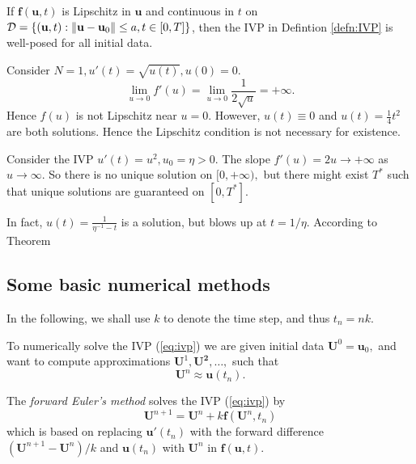 \begin{defn}
  If $\mathbf{f}(\mathbf{u},t)$ is Lipschitz in $\mathbf{u}$ and
  continuous in $t$ on ${\cal
    D}=\{(\mathbf{u},t):\Vert\mathbf{u}-\mathbf{u}_0\Vert\leq a,t\in
  [0,T]\}$, then the IVP in Defintion \ref{defn:IVP} is well-posed
  for all initial data.
\end{defn}

\begin{exm}
  Consider $N=1,u'(t)=\sqrt{u(t)},u(0)=0.$
  \begin{displaymath}
    \lim_{u\rightarrow 0} f'(u)=\lim_{u\rightarrow 0}
    \frac{1}{2\sqrt{u}}=+\infty.
  \end{displaymath}
  Hence $f(u)$ is not Lipschitz near $u=0$.
  However, $u(t)\equiv 0$ and $u(t)=\frac{1}{4}t^2$ are both
  solutions.
  Hence the Lipschitz condition is not necessary for existence.
\end{exm}

\begin{exm}
  Consider the IVP $u'(t)=u^2,u_0=\eta>0.$
  The slope $f'(u)=2u \rightarrow +\infty$ as $u\rightarrow \infty$.
  So there is no unique solution on $[0,+\infty),$ but there might
  exist
  $T^*$ such that unique solutions are guaranteed on $[0,T^*]$.

  In fact, $u(t)=\frac{1}{\eta^{-1}-t}$ is a solution,
  but blows up at $t=1/\eta.$
  According to Theorem 
\end{exm}


\subsection{Some basic numerical methods}

\label{sec:some-basic-numerical}
\begin{ntn}
  In the following, we shall use $k$ to denote the time step,
  and thus $t_n=nk$.
\end{ntn}

To numerically solve the IVP (\ref{eq:ivp}) we are given
initial data $\mathbf{U}^0=\mathbf{u}_0,$
and want to compute approximations $\mathbf{U}^1,\mathbf{U^2},\ldots,$
such that
\begin{displaymath}
  \mathbf{U}^n\approx \mathbf{u}(t_n).
\end{displaymath}

\begin{defn}
  The \emph{forward Euler's method} solves the IVP (\ref{eq:ivp})
  by
  \begin{equation}
    \mathbf{U}^{n+1} = \mathbf{U}^n+k\mathbf{f}(\mathbf{U}^n,t_n)
  \end{equation}
  which is based on replacing $\mathbf{u}'(t_{n})$ with the forward
  difference $(\mathbf{U}^{n+1}-\mathbf{U}^n)/k$ and
  $\mathbf{u}(t_{n})$
  with $\mathbf{U}^{n}$ in $\mathbf{f}(\mathbf{u},t)$.
\end{defn}

